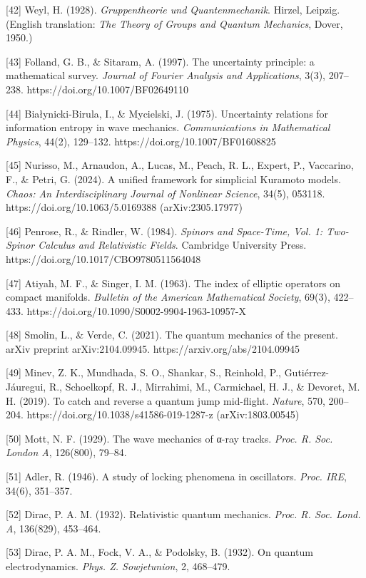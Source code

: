 \documentclass[
]{article}
\begin{document}
{[}42{]} Weyl, H. (1928). \emph{Gruppentheorie und Quantenmechanik}.
Hirzel, Leipzig. (English translation: \emph{The Theory of Groups and
Quantum Mechanics}, Dover, 1950.)

{[}43{]} Folland, G. B., \& Sitaram, A. (1997). The uncertainty
principle: a mathematical survey. \emph{Journal of Fourier Analysis and
Applications}, 3(3), 207--238. https://doi.org/10.1007/BF02649110

{[}44{]} Białynicki-Birula, I., \& Mycielski, J. (1975). Uncertainty
relations for information entropy in wave mechanics.
\emph{Communications in Mathematical Physics}, 44(2), 129--132.
https://doi.org/10.1007/BF01608825

{[}45{]} Nurisso, M., Arnaudon, A., Lucas, M., Peach, R. L., Expert, P.,
Vaccarino, F., \& Petri, G. (2024). A unified framework for simplicial
Kuramoto models. \emph{Chaos: An Interdisciplinary Journal of Nonlinear
Science}, 34(5), 053118. https://doi.org/10.1063/5.0169388
(arXiv:2305.17977)

{[}46{]} Penrose, R., \& Rindler, W. (1984). \emph{Spinors and
Space-Time, Vol. 1: Two-Spinor Calculus and Relativistic Fields}.
Cambridge University Press. https://doi.org/10.1017/CBO9780511564048

{[}47{]} Atiyah, M. F., \& Singer, I. M. (1963). The index of elliptic
operators on compact manifolds. \emph{Bulletin of the American
Mathematical Society}, 69(3), 422--433.
https://doi.org/10.1090/S0002-9904-1963-10957-X

{[}48{]} Smolin, L., \& Verde, C. (2021). The quantum mechanics of the
present. arXiv preprint arXiv:2104.09945.
https://arxiv.org/abs/2104.09945

{[}49{]} Minev, Z. K., Mundhada, S. O., Shankar, S., Reinhold, P.,
Gutiérrez-Jáuregui, R., Schoelkopf, R. J., Mirrahimi, M., Carmichael, H.
J., \& Devoret, M. H. (2019). To catch and reverse a quantum jump
mid-flight. \emph{Nature}, 570, 200--204.
https://doi.org/10.1038/s41586-019-1287-z (arXiv:1803.00545)

{[}50{]} Mott, N. F. (1929). The wave mechanics of α-ray tracks.
\emph{Proc. R. Soc. London A}, 126(800), 79--84.

{[}51{]} Adler, R. (1946). A study of locking phenomena in oscillators.
\emph{Proc. IRE}, 34(6), 351--357.

{[}52{]} Dirac, P. A. M. (1932). Relativistic quantum mechanics.
\emph{Proc. R. Soc. Lond. A}, 136(829), 453--464.

{[}53{]} Dirac, P. A. M., Fock, V. A., \& Podolsky, B. (1932). On
quantum electrodynamics. \emph{Phys. Z. Sowjetunion}, 2, 468--479.
\end{document}
